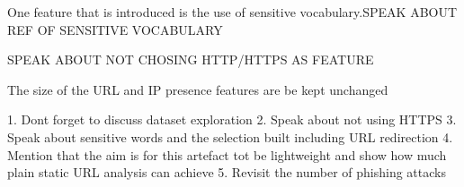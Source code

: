One feature that is introduced is the use of sensitive vocabulary.SPEAK ABOUT REF OF SENSITIVE VOCABULARY

SPEAK ABOUT NOT CHOSING HTTP/HTTPS AS FEATURE

The size of the URL and IP presence features are be kept unchanged


1. Dont forget to discuss dataset exploration
2. Speak about not using HTTPS
3. Speak about sensitive words and the selection built including URL redirection
4. Mention that the aim is for this artefact tot be lightweight and show how much plain static URL analysis can achieve
5. Revisit the number of phishing attacks

\fi